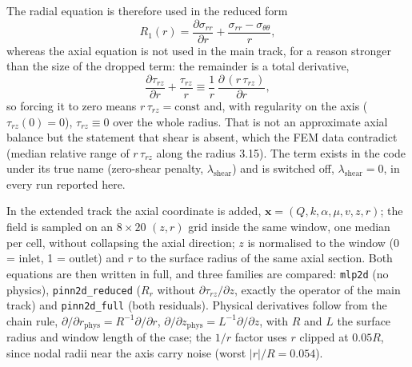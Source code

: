 The radial equation is therefore used in the reduced form
\begin{equation}
  R_1(r) = \frac{\partial\sigma_{rr}}{\partial r}
         + \frac{\sigma_{rr}-\sigma_{\theta\theta}}{r},
  \label{eq:eq_red}
\end{equation}
whereas the axial equation is not used in the main track, for a reason stronger
than the size of the dropped term: the remainder is a total derivative,
\begin{equation}
  \frac{\partial\tau_{rz}}{\partial r} + \frac{\tau_{rz}}{r}
  \equiv \frac{1}{r}\,\frac{\partial\,(r\,\tau_{rz})}{\partial r},
  \label{eq:identity}
\end{equation}
so forcing it to zero means $r\,\tau_{rz}=\mathrm{const}$ and, with regularity on
the axis ($\tau_{rz}(0)=0$), $\tau_{rz}\equiv0$ over the whole radius. That is not
an approximate axial balance but the statement that shear is absent, which the
FEM data contradict (median relative range of $r\,\tau_{rz}$ along the radius
3.15).
The term exists in the code under its true name (zero-shear penalty,
$\lambda_{\mathrm{shear}}$) and is switched off, $\lambda_{\mathrm{shear}}=0$, in
every run reported here.

In the extended track the axial coordinate is added,
$\mathbf{x}=(Q,k,\alpha,\mu,v,z,r)$; the field is sampled on an $8\times20$ $(z,r)$
grid inside the same window, one median per cell, without collapsing the axial
direction; $z$ is normalised to the window (0 = inlet, 1 = outlet) and $r$ to the
surface radius of the same axial section.
Both equations are then written in full, and three families are compared:
\texttt{mlp2d} (no physics), \texttt{pinn2d\_reduced} ($R_r$ without
$\partial\tau_{rz}/\partial z$, exactly the operator of the main track) and
\texttt{pinn2d\_full} (both residuals).
Physical derivatives follow from the chain rule,
$\partial/\partial r_{\mathrm{phys}}=R^{-1}\partial/\partial r$,
$\partial/\partial z_{\mathrm{phys}}=L^{-1}\partial/\partial z$, with $R$ and $L$
the surface radius and window length of the case; the $1/r$ factor uses $r$
clipped at $0.05R$, since nodal radii near the axis carry noise (worst
$|r|/R=0.054$).

